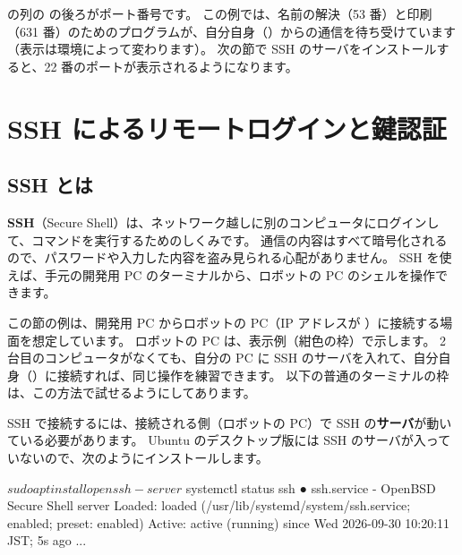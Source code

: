 
 の列の \cmd{:} の後ろがポート番号です。
この例では、名前の解決（53 番）と印刷（631 番）のためのプログラムが、自分自身（）からの通信を待ち受けています（表示は環境によって変わります）。
次の節で SSH のサーバをインストールすると、22 番のポートが表示されるようになります。

\section{SSH によるリモートログインと鍵認証}
\label{sec:network-ssh}

\subsection{SSH とは}

\textbf{SSH}（Secure Shell）は、ネットワーク越しに別のコンピュータにログインして、コマンドを実行するためのしくみです。
通信の内容はすべて暗号化されるので、パスワードや入力した内容を盗み見られる心配がありません。
SSH を使えば、手元の開発用 PC のターミナルから、ロボットの PC のシェルを操作できます。

\begin{point}[2 台目のコンピュータがないとき]
  この節の例は、開発用 PC からロボットの PC（IP アドレスが ）に接続する場面を想定しています。
  ロボットの PC は、表示例（紺色の枠）で示します。
  2 台目のコンピュータがなくても、自分の PC に SSH のサーバを入れて、自分自身（）に接続すれば、同じ操作を練習できます。
  以下の普通のターミナルの枠は、この方法で試せるようにしてあります。
\end{point}

SSH で接続するには、接続される側（ロボットの PC）で SSH の\textbf{サーバ}が動いている必要があります。
Ubuntu のデスクトップ版には SSH のサーバが入っていないので、次のようにインストールします。

\begin{terminal}
$ sudo apt install openssh-server
$ systemctl status ssh
● ssh.service - OpenBSD Secure Shell server
     Loaded: loaded (/usr/lib/systemd/system/ssh.service; enabled; preset: enabled)
     Active: active (running) since Wed 2026-09-30 10:20:11 JST; 5s ago
...
\end{terminal}

